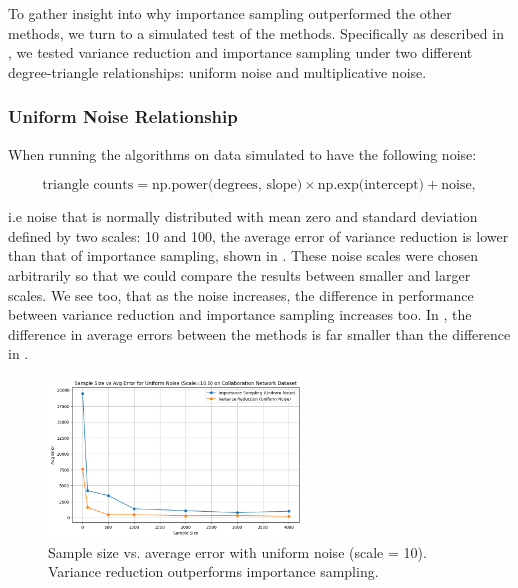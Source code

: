 \documentclass[11pt, margin=1in]{article}
\begin{document}
To gather insight into why importance sampling outperformed the other methods, we turn to a simulated test of the methods.
Specifically as described in , we tested variance reduction and importance sampling under two different degree-triangle relationships: uniform noise and multiplicative noise.

\subsubsection{Uniform Noise Relationship}

When running the algorithms on data simulated to have the following noise:

\[
\text{triangle counts} = \text{np.power(degrees, slope)} \times \text{np.exp(intercept)} + \text{noise},
\]

i.e noise that is normally distributed with mean zero and standard deviation defined by two scales: 10 and 100, the average error of variance reduction is lower than that of importance sampling, shown in .
These noise scales were chosen arbitrarily so that we could compare the results between smaller and larger scales.
We see too, that as the noise increases, the difference in performance between variance reduction and importance sampling increases too.
In , the difference in average errors between the methods is far smaller than the difference in .

\begin{figure}[H]
    \centering
    \includegraphics[width=0.6\textwidth]{plots/simulated/percent_error_vs_sample_size_comparison_uniform_10.0.png}
    \caption{Sample size vs. average error with uniform noise (scale = 10). Variance reduction outperforms importance sampling.}
    \label{fig:uniform_noise_10}
\end{figure}
\end{document}
